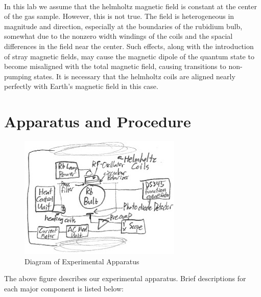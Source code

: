\documentclass{article}
\begin{document}
    \\\indent In this lab we assume that the helmholtz magnetic field is constant at the center of the gas sample. However, this is not true. The field is heterogeneous in magnitude and direction, especially at the boundaries of the rubidium bulb, somewhat due to the nonzero width windings of the coils and the spacial differences in the field near the center. Such effects, along with the introduction of stray magnetic fields, may cause the magnetic dipole of the quantum state to become misaligned with the total magnetic field, causing transitions to non-pumping states. It is necessary that the helmholtz coils are aligned nearly perfectly with Earth's magnetic field in this case.\cite{nuc}

\section{Apparatus and Procedure}
    \begin{figure}[H] %
        \centering
        \includegraphics[scale = 0.45]{18.jpg}
        \caption{Diagram of Experimental Apparatus}
        \label{fig:my_label}
    \end{figure}
    The above figure describes our experimental apparatus. Brief descriptions for each major component is listed below:
\end{document}
